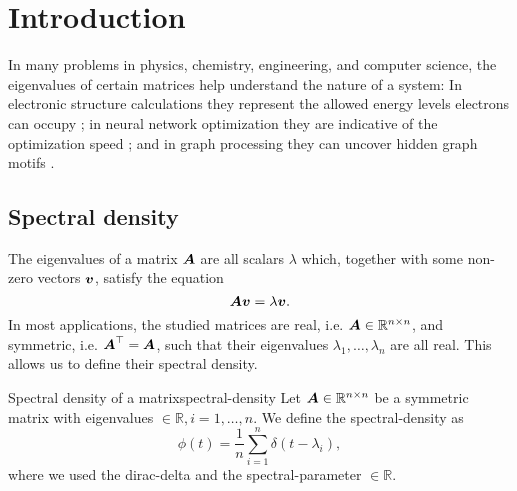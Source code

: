 \chapter{Introduction}
\label{chp:1-introduction}

In many problems in physics, chemistry, engineering, and computer science, 
the eigenvalues of certain matrices help understand the nature of a system:
In electronic structure calculations they represent the allowed energy levels 
electrons can occupy \cite{ducastelle1970charge, haydock1972electronic, lin2017randomized};
in neural network optimization they are indicative of the optimization speed \cite{ghorbani2019investigation,chen2021slq,adepu2021hessian};
and in graph processing they can uncover hidden graph motifs \cite{kruzick2018graph,huang2021kernels,patane2022filter}.\\

\section{Spectral density}
\label{sec:1-introduction-spectral-density}

The eigenvalues of a matrix $\boldsymbol{A}$ are all scalars $\lambda$ which, together
with some non-zero vectors $\boldsymbol{v}$, satisfy the equation
\begin{equation}
    \boldsymbol{A} \boldsymbol{v} = \lambda \boldsymbol{v}.
    \label{equ:1-introduction-eigenvalue}
\end{equation}
In most applications, the studied matrices are real,
i.e. $\boldsymbol{A} \in \mathbb{R}^{n \times n}$, and symmetric, i.e. $\boldsymbol{A}^{\top} = \boldsymbol{A}$,
such that their eigenvalues $\lambda_1, \dots, \lambda_n$ are all real.
This allows us to define their spectral density.

\begin{definition}{Spectral density of a matrix}{spectral-density}
    Let $\boldsymbol{A} \in \mathbb{R}^{n \times n}$ be a symmetric matrix with \glspl{eigenvalue}
    $\in \mathbb{R}, i=1, \dots, n$. We define the \gls{spectral-density} as
    \begin{equation}
        \phi(t) = \frac{1}{n} \sum_{i=1}^{n} \delta(t - \lambda_i),
        \label{equ:1-introduction-def-spectral-density}
    \end{equation}
    where we used the \gls{dirac-delta}
    and the \gls{spectral-parameter} $\in \mathbb{R}$.
\end{definition}

